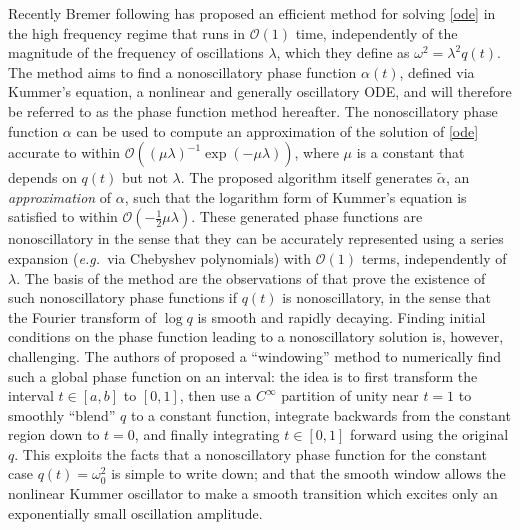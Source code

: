 \documentclass[10pt]{article}
\newcommand{\eg}{{\it e.g.\ }}
\newcommand{\bigO}{{\mathcal O}}
\newcommand{\om}{\omega}
\begin{document}
Recently Bremer \cite{bremer2018} following \cite{heitman2015,bremer2016} has proposed an efficient
method for solving \cref{ode} in the high frequency regime that runs
in $\bigO(1)$ time, independently of the magnitude of the frequency of
oscillations $\lambda$, which they define as $\om^2 = \lambda^2 q(t)$.
The method aims to find a nonoscillatory phase function $\alpha(t)$, defined
via Kummer's equation, a nonlinear and generally oscillatory ODE, and will therefore be
referred to as the phase function method hereafter.
The nonoscillatory phase function $\alpha$ can be used to compute an approximation
of the solution of \cref{ode} accurate to within
$\bigO((\mu\lambda)^{-1}\exp(-\mu\lambda))$, where $\mu$ is a constant that depends on $q(t)$ but not $\lambda$.
The proposed algorithm itself generates $\tilde{\alpha}$, an
\emph{approximation} of $\alpha$, such that the logarithm form of Kummer's
equation is satisfied to within $\bigO(-\tfrac{1}{2}\mu\lambda)$. These
generated phase functions are nonoscillatory in the sense that they can be
accurately represented using a series expansion (\eg via Chebyshev polynomials)
with $\bigO(1)$ terms, independently of $\lambda$.
The basis of the method are the observations of \cite{heitman2015,bremer2016}
that prove the existence of such nonoscillatory phase functions if $q(t)$ is
nonoscillatory, in the sense that the Fourier transform of $\log q$ is smooth
and rapidly decaying.
Finding initial conditions on the phase function leading to
a nonoscillatory solution is, however, challenging.
The authors of \cite{bremer2018} proposed a ``windowing'' method to numerically find such a global phase function
on an interval:
the idea is to first transform the interval $t \in [a,b]$ to $[0, 1]$, then use a $C^\infty$ partition of unity near $t=1$ to smoothly ``blend'' $q$ to
a constant function, integrate backwards from the constant region
down to $t = 0$, and finally integrating $t \in [0,1]$ forward using the original $q$.
This exploits the facts that a nonoscillatory phase function for
the constant case $q(t) = \om_0^2$ is simple to write down; and
that the smooth window allows
the nonlinear Kummer oscillator to make a smooth 
transition which excites only an exponentially small oscillation amplitude.
\end{document}
